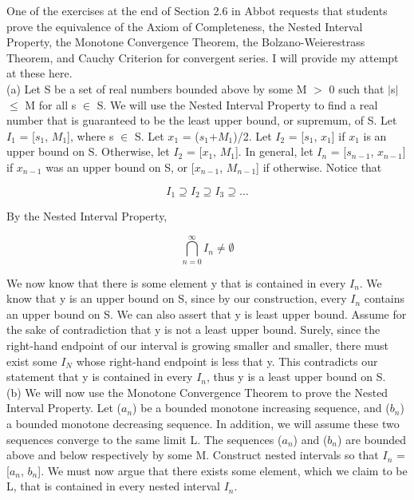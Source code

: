 \documentclass{article}
\begin{document}
One of the exercises at the end of Section 2.6 in Abbot requests that students prove the equivalence of the Axiom of Completeness, the Nested Interval Property, the Monotone Convergence Theorem, the Bolzano-Weierestrass Theorem, and Cauchy Criterion for convergent series. I will provide my attempt at these here. \\  

(a) Let S be a set of real numbers bounded above by some M $>$ 0 such that $\mid$s$\mid$ $\leq$ M for all s $\in$ S. We will use the Nested Interval Property to find a real number that is guaranteed to be the least upper bound, or supremum, of S. Let $I_1$ = [$s_1$, $M_1$], where s $\in$ S. Let $x_1$ = ($s_1$+$M_1$)/2. Let $I_2$ = [$s_1$, $x_1$] if $x_1$ is an upper bound on S. Otherwise, let $I_2$ = [$x_1$, $M_1$]. In general, let $I_n$ = [$s_{n-1}$, $x_{n-1}$] if $x_{n-1}$ was an upper bound on S, or [$x_{n-1}$, $M_{n-1}$] if otherwise. Notice that 

\begin{equation}
    I_1 \supseteq I_2 \supseteq I_3 \supseteq \ldots
\end{equation}

By the Nested Interval Property, 

\begin{equation}
    \bigcap^\infty_{n=0} I_n \neq \emptyset
\end{equation}

We now know that there is some element y that is contained in every $I_n$. We know that y is an upper bound on S, since by our construction, every $I_n$ contains an upper bound on S. We can also assert that y is least upper bound. Assume for the sake of contradiction that y is not a least upper bound. Surely, since the right-hand endpoint of our interval is growing smaller and smaller, there must exist some $I_N$ whose right-hand endpoint is less that y. This contradicts our statement that y is contained in every $I_n$, thus y is a least upper bound on S. \\

(b) We will now use the Monotone Convergence Theorem to prove the Nested Interval Property. Let ($a_n$) be a bounded monotone increasing sequence, and ($b_n$) a bounded monotone decreasing sequence. In addition, we will assume these two sequences converge to the same limit L. The sequences ($a_n$) and ($b_n$) are bounded above and below respectively by some M. Construct nested intervals so that $I_n$ = [$a_n$, $b_n$]. We must now argue that there exists some element, which we claim to be L, that is contained in every nested interval $I_n$.
\end{document}
